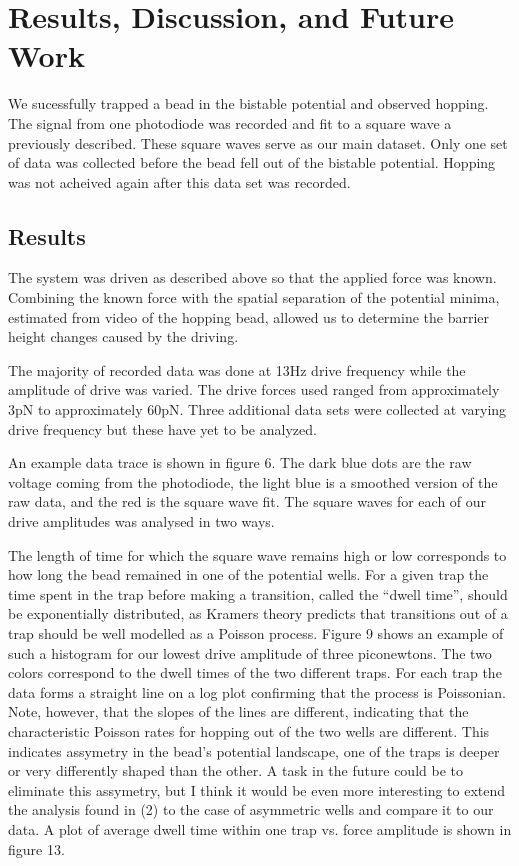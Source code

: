 \documentclass{report}
\begin{document}

\chapter{Results, Discussion, and Future Work}

We sucessfully trapped a bead in the bistable potential and observed hopping. The signal from one photodiode was recorded and fit to a square wave a previously described. These square waves serve as our main dataset. Only one set of data was collected before the bead fell out of the bistable potential. Hopping was not acheived again after this data set was recorded.

\section{Results}

The system was driven as described above so that the applied force was known. Combining the known force with the spatial separation of the potential minima, estimated from video of the hopping bead, allowed us to determine the barrier height changes caused by the driving.

The majority of recorded data was done at 13Hz drive frequency while the amplitude of drive was varied. The drive forces used ranged from approximately 3pN to approximately 60pN. Three additional data sets were collected at varying drive frequency but these have yet to be analyzed.

An example data trace is shown in figure 6. The dark blue dots are the raw voltage coming from the photodiode, the light blue is a smoothed version of the raw data, and the red is the square wave fit. The square waves for each of our drive amplitudes was analysed in two ways.

The length of time for which the square wave remains high or low corresponds to how long the bead remained in one of the potential wells. For a given trap the time spent in the trap before making a transition, called the ``dwell time'', should be exponentially distributed, as Kramers theory predicts that transitions out of a trap should be well modelled as a Poisson process. Figure 9 shows an example of such a histogram for our lowest drive amplitude of three piconewtons. The two colors correspond to the dwell times of the two different traps. For each trap the data forms a straight line on a log plot confirming that the process is Poissonian. Note, however, that the slopes of the lines are different, indicating that the characteristic Poisson rates for hopping out of the two wells are different. This indicates assymetry in the bead's potential landscape, one of the traps is deeper or very differently shaped than the other. A task in the future could be to eliminate this assymetry, but I think it would be even more interesting to extend the analysis found in (2) to the case of asymmetric wells and compare it to our data. A plot of average dwell time within one trap vs. force amplitude is shown in figure 13.
\end{document}
